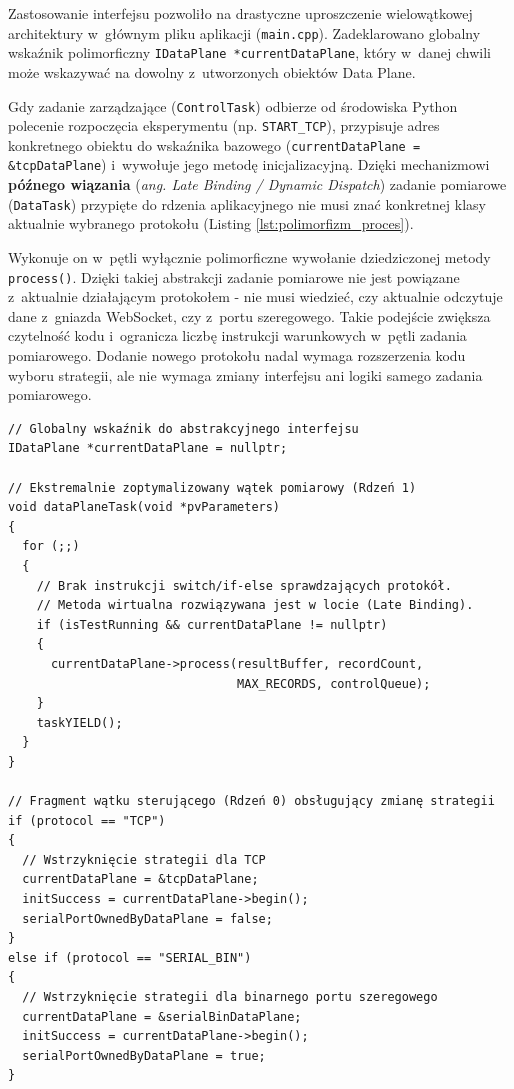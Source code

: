 Zastosowanie interfejsu pozwoliło na drastyczne uproszczenie wielowątkowej architektury w~głównym pliku aplikacji (\texttt{main.cpp}).
Zadeklarowano globalny wskaźnik polimorficzny \texttt{IDataPlane *currentDataPlane}, który w~danej chwili może wskazywać na dowolny z~utworzonych obiektów Data Plane.

Gdy zadanie zarządzające (\texttt{ControlTask}) odbierze od środowiska Python polecenie rozpoczęcia eksperymentu (np. \texttt{START\_TCP}), przypisuje adres konkretnego obiektu do wskaźnika bazowego (\texttt{currentDataPlane = \&tcpDataPlane}) i~wywołuje jego metodę inicjalizacyjną.
Dzięki mechanizmowi \textbf{późnego wiązania} (\textit{ang. Late Binding / Dynamic Dispatch}) zadanie pomiarowe (\texttt{DataTask}) przypięte do rdzenia aplikacyjnego nie musi znać konkretnej klasy aktualnie wybranego protokołu (Listing \ref{lst:polimorfizm_proces}).

Wykonuje on w~pętli wyłącznie polimorficzne wywołanie dziedziczonej metody \texttt{process()}.
Dzięki takiej abstrakcji zadanie pomiarowe nie jest powiązane z~aktualnie działającym protokołem - nie musi wiedzieć, czy aktualnie odczytuje dane z~gniazda WebSocket, czy z~portu szeregowego.
Takie podejście zwiększa czytelność kodu i~ogranicza liczbę instrukcji warunkowych w~pętli zadania pomiarowego. Dodanie nowego protokołu nadal wymaga rozszerzenia kodu wyboru strategii, ale nie wymaga zmiany interfejsu ani logiki samego zadania pomiarowego.

\begin{listing}[htbp]
    \caption{Wykorzystanie polimorfizmu do obsługi różnych protokołów w~zadaniu pomiarowym (\texttt{main.cpp}) \cite{espy_nexus_esp32_firmware}.}
    \label{lst:polimorfizm_proces}
    \begin{verbatim}
// Globalny wskaźnik do abstrakcyjnego interfejsu
IDataPlane *currentDataPlane = nullptr;

// Ekstremalnie zoptymalizowany wątek pomiarowy (Rdzeń 1)
void dataPlaneTask(void *pvParameters)
{
  for (;;)
  {
    // Brak instrukcji switch/if-else sprawdzających protokół.
    // Metoda wirtualna rozwiązywana jest w locie (Late Binding).
    if (isTestRunning && currentDataPlane != nullptr)
    {
      currentDataPlane->process(resultBuffer, recordCount, 
                                MAX_RECORDS, controlQueue);
    }
    taskYIELD();
  }
}

// Fragment wątku sterującego (Rdzeń 0) obsługujący zmianę strategii
if (protocol == "TCP")
{
  // Wstrzyknięcie strategii dla TCP
  currentDataPlane = &tcpDataPlane;
  initSuccess = currentDataPlane->begin();
  serialPortOwnedByDataPlane = false;
}
else if (protocol == "SERIAL_BIN")
{
  // Wstrzyknięcie strategii dla binarnego portu szeregowego
  currentDataPlane = &serialBinDataPlane;
  initSuccess = currentDataPlane->begin();
  serialPortOwnedByDataPlane = true;
}
\end{verbatim}
\end{listing}

